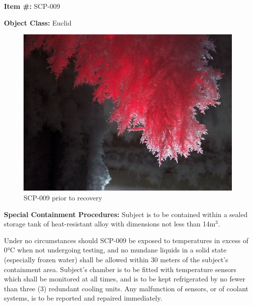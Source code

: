 \textbf{Item \#:} SCP-009

\textbf{Object Class:} Euclid

\begin{figure}[h]
\begin{center}
\includegraphics[scale=1.3]{scp/009.jpg}
\linebreak SCP-009 prior to recovery
\end{center}
\end{figure}


\textbf{Special Containment Procedures:} Subject is to be contained within a sealed storage tank of heat-resistant alloy with dimensions not less than 14m$^3$.

Under no circumstances should SCP-009 be exposed to temperatures in excess of 0°C when not undergoing testing, and no mundane liquids in a solid state (especially frozen water) shall be allowed within 30 meters of the subject's containment area. Subject's chamber is to be fitted with temperature sensors which shall be monitored at all times, and is to be kept refrigerated by no fewer than three (3) redundant cooling units. Any malfunction of sensors, or of coolant systems, is to be reported and repaired immediately.

